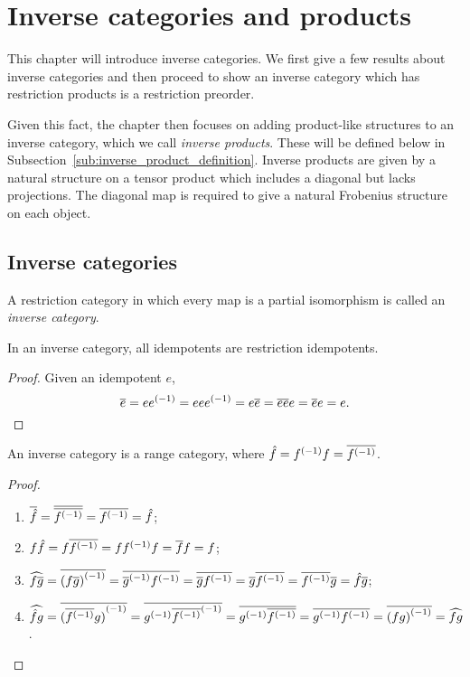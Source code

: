\chapter{Inverse categories and products} %
\label{cha:inverse_categories}

This chapter will introduce inverse categories. We first give
a few results about inverse categories and then proceed to show an inverse category which has
restriction products is a restriction preorder.

Given this fact, the chapter then focuses on adding product-like structures to an inverse category,
which we call \emph{inverse products}. These will be defined below in
Subsection~\ref{sub:inverse_product_definition}. Inverse products are given by a natural structure
on a tensor product which includes a diagonal but lacks projections. The diagonal map is required to
give a natural Frobenius structure on each object.

\section{Inverse categories}
\label{sec:inverse_categories}

\begin{definition}\label{def:inverse_category}
  A restriction category in which every map is a partial
  isomorphism is called an \emph{inverse category}.
\end{definition}

\begin{lemma}
  \label{lem:inverse_idempotents_are_restriction_idempotents}
  In an inverse category, all idempotents are restriction idempotents.
\end{lemma}
\begin{proof}
  Given an idempotent $e$,
  \[
    \overline{e} = e{e}^{(-1)} = e e {e}^{(-1)} = e \overline{e} = \overline{e e} e = \overline{e} e = e.
  \]
\end{proof}

\begin{lemma}\label{lem:inverse_categories_are_range_categories}
  An inverse category \X is a range category, where $\hat{f} = {f}^{(-1)}f = \overline{{f}^{(-1)}}$.
\end{lemma}
\begin{proof}
  \prepprooflist
  \begin{enumerate}
    \item[\rrone] $\overline{\hat{f}} = \overline{\overline{{f}^{(-1)}}} = \overline{{f}^{(-1)}} = \hat{f}$;
    \item[\rrtwo] $f \hat{f} = f \overline{{f}^{(-1)}} = f {f}^{(-1)} f = \overline{f} f = f$;
    \item[\rrthree] $\widehat{f\overline{g}} = \overline{{(f\overline{g})}^{(-1)}} = \overline{{\overline{g}}^{(-1)} {f}^{(-1)}} =
      \overline{\overline{g} {f}^{(-1)}} =
      \overline{g} \overline{{f}^{(-1)}} = \overline{{f}^{(-1)}} \overline{g} =\hat{f} \overline{g}$;
    \item[\rrfour]  $\widehat{\hat{f}g} = \overline{{(\overline{{f}^{(-1)}} g)}^{(-1)}} =
      \overline{{g}^{(-1)}{\overline{{f}^{(-1)}}}^{(-1)}} = \overline{{g}^{(-1)} \overline{{f}^{(-1)}}} =
      \overline{{g}^{(-1)} {f}^{(-1)}} = \overline{{(f g)}^{(-1)}} = \widehat{f g}$.
  \end{enumerate}
\end{proof}

